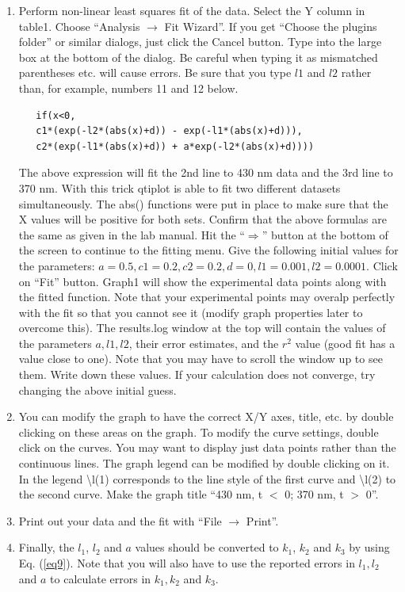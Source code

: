 \documentclass[byrevtex,amssymb,aps,pra,floatfix,letterpaper]{revtex4}
\begin{document}
\begin{enumerate}
\item Perform non-linear least squares fit of the data. Select the Y column in table1. Choose ``Analysis $\rightarrow$ Fit Wizard''. If you get ``Choose the plugins folder'' or similar dialogs, just click the Cancel button. Type into the large box at the bottom of the dialog. Be careful when typing it as mismatched parentheses etc. will cause errors. Be sure that you type $l1$ and $l2$ rather than, for example, numbers 11 and 12 below. 
\begin{verbatim}
   if(x<0, 
   c1*(exp(-l2*(abs(x)+d)) - exp(-l1*(abs(x)+d))),
   c2*(exp(-l1*(abs(x)+d)) + a*exp(-l2*(abs(x)+d))))
\end{verbatim}
The above expression will fit the 2nd line to 430 nm data and the 3rd line to 370 nm. With this trick qtiplot is able to fit two different datasets simultaneously. The abs() functions were put in place to make sure that the X values will be positive for both sets. Confirm that the above formulas are the same as given in the lab manual. Hit the ``$\Rightarrow$'' button at the bottom of the screen to continue to the fitting menu. Give the following initial values for the parameters: $a = 0.5,  c1 = 0.2, c2 = 0.2, d = 0, l1 = 0.001, l2 = 0.0001$. Click on ``Fit'' button. Graph1 will show the experimental data points along with the fitted function. Note that your experimental points may overalp perfectly with the fit so that you cannot see it (modify graph properties later to overcome this). The results.log window at the top will contain the values of the parameters $a, l1, l2$, their error estimates, and the $r^2$ value (good fit has a value close to one). Note that you may have to scroll the window up to see them. Write down these values. If your calculation does not converge, try changing the above initial guess.

\item You can modify the graph to have the correct X/Y axes, title, etc. by double clicking on these areas on the graph. To modify the curve settings, double click on the curves. You may want to display just data points rather than the continuous lines. The graph legend can be modified by double clicking on it. In the legend \textbackslash l(1) corresponds to the line style of the first curve and \textbackslash l(2) to the second curve. Make the graph title ``430 nm, t $<$ 0; 370 nm, t $>$ 0''.

\item Print out your data and the fit with ``File $\rightarrow$ Print''.

\item Finally, the $l_1$, $l_2$ and $a$ values should be converted to $k_1$, $k_2$ and $k_3$ by using Eq. (\ref{eq9}). Note that you will also have to use the reported errors in $l_1, l_2$ and $a$ to calculate errors in $k_1, k_2$ and $k_3$.

\end{enumerate}
\end{document}
